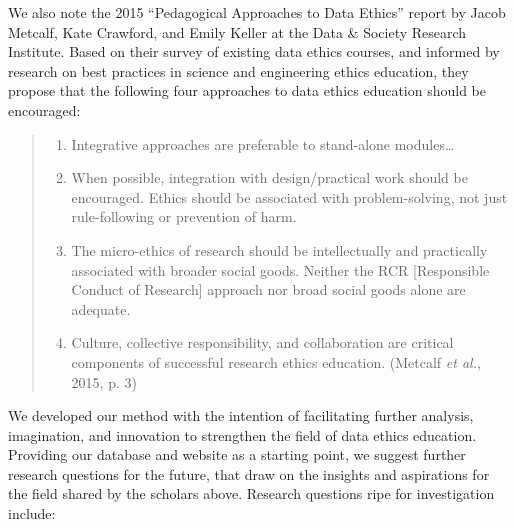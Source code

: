 \documentclass[
]{article}
\providecommand{\tightlist}{%
  \setlength{\itemsep}{0pt}\setlength{\parskip}{0pt}}
\begin{document}
We also note the 2015 ``Pedagogical Approaches to Data Ethics'' report
by Jacob Metcalf, Kate Crawford, and Emily Keller at the Data \& Society
Research Institute. Based on their survey of existing data ethics
courses, and informed by research on best practices in science and
engineering ethics education, they propose that the following four
approaches to data ethics education should be encouraged:

\begin{quote}
\begin{enumerate}
\def\labelenumi{\arabic{enumi})}
\tightlist
\item
  Integrative approaches are preferable to stand-alone modules\ldots{}
\item
  When possible, integration with design/practical work should be
  encouraged. Ethics should be associated with problem-solving, not just
  rule-following or prevention of harm.
\item
  The micro-ethics of research should be intellectually and practically
  associated with broader social goods. Neither the RCR {[}Responsible
  Conduct of Research{]} approach nor broad social goods alone are
  adequate.
\item
  Culture, collective responsibility, and collaboration are critical
  components of successful research ethics education. (Metcalf \emph{et
  al.}, 2015, p. 3)
\end{enumerate}
\end{quote}

We developed our method with the intention of facilitating further
analysis, imagination, and innovation to strengthen the field of data
ethics education. Providing our database and website as a starting
point, we suggest further research questions for the future, that draw
on the insights and aspirations for the field shared by the scholars
above. Research questions ripe for investigation include:
\end{document}
